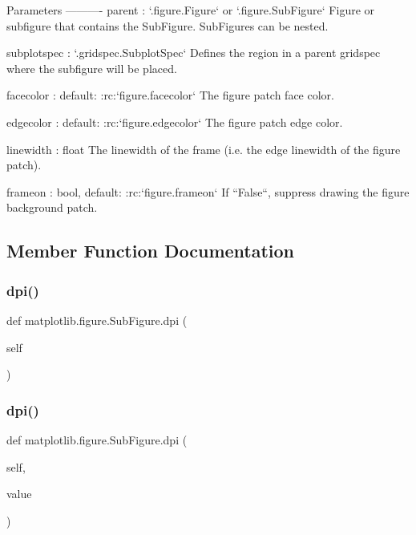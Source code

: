 \begin{DoxyVerb}Parameters
----------
parent : `.figure.Figure` or `.figure.SubFigure`
    Figure or subfigure that contains the SubFigure.  SubFigures
    can be nested.

subplotspec : `.gridspec.SubplotSpec`
    Defines the region in a parent gridspec where the subfigure will
    be placed.

facecolor : default: :rc:`figure.facecolor`
    The figure patch face color.

edgecolor : default: :rc:`figure.edgecolor`
    The figure patch edge color.

linewidth : float
    The linewidth of the frame (i.e. the edge linewidth of the figure
    patch).

frameon : bool, default: :rc:`figure.frameon`
    If ``False``, suppress drawing the figure background patch.
\end{DoxyVerb}
 

\subsection{Member Function Documentation}
\mbox{\label{classmatplotlib_1_1figure_1_1SubFigure_a36bc49dcf866989ca720f851beca8ae4}} 
\subsubsection{\texorpdfstring{dpi()}{dpi()}\hspace{0.1cm}{\footnotesize\ttfamily [1/2]}}
{\footnotesize\ttfamily def matplotlib.\+figure.\+Sub\+Figure.\+dpi (\begin{DoxyParamCaption}\item[{}]{self }\end{DoxyParamCaption})}

\mbox{\label{classmatplotlib_1_1figure_1_1SubFigure_a6fbfcdcf8c3fc1f3d58642dcf5aaa77d}} 
\subsubsection{\texorpdfstring{dpi()}{dpi()}\hspace{0.1cm}{\footnotesize\ttfamily [2/2]}}
{\footnotesize\ttfamily def matplotlib.\+figure.\+Sub\+Figure.\+dpi (\begin{DoxyParamCaption}\item[{}]{self,  }\item[{}]{value }\end{DoxyParamCaption})}

